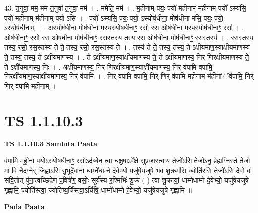 \documentclass[17pt]{extarticle}
\begin{document}
43. त॒नुवा॒ मम॒ मम॑ त॒नुवा॑ त॒नुवा॒ मम॑ । . ममेति॒ मम॑ । . म॒ही॒नाम् पयः॒ पयो॑ मही॒नाम् म॑ही॒नाम् पयो᳚ ऽस्यसि॒ पयो॑ मही॒नाम् म॑ही॒नाम् पयो॑ ऽसि । . पयो᳚ ऽस्यसि॒ पयः॒ पयो॒ ऽस्योष॑धीना॒ मोष॑धीना मसि॒ पयः॒ पयो॒ ऽस्योष॑धीनाम् । . अ॒स्योष॑धीना॒ मोष॑धीना मस्य॒स्योष॑धीनाꣳ॒॒ रसो॒ रस॒ ओष॑धीना मस्य॒स्योष॑धीनाꣳ॒॒ रसः॑ । . ओष॑धीनाꣳ॒॒ रसो॒ रस॒ ओष॑धीना॒ मोष॑धीनाꣳ॒॒ रस॒स्तस्य॒ तस्य॒ रस॒ ओष॑धीना॒ मोष॑धीनाꣳ॒॒ रस॒स्तस्य॑ । . रस॒स्तस्य॒ तस्य॒ रसो॒ रस॒स्तस्य॑ ते ते॒ तस्य॒ रसो॒ रस॒स्तस्य॑ ते । . तस्य॑ ते ते॒ तस्य॒ तस्य॒ ते ऽक्षी॑यमाण॒स्याक्षी॑यमाणस्य ते॒ तस्य॒ तस्य॒ ते ऽक्षी॑यमाणस्य । . ते ऽक्षी॑यमाण॒स्याक्षी॑यमाणस्य ते॒ ते ऽक्षी॑यमाणस्य॒ निर् णिरक्षी॑यमाणस्य ते॒ ते ऽक्षी॑यमाणस्य॒ निः । . अक्षी॑यमाणस्य॒ निर् णिरक्षी॑यमाण॒स्याक्षी॑यमाणस्य॒ निर् व॑पामि वपामि॒ निरक्षी॑यमाण॒स्याक्षी॑यमाणस्य॒ निर् व॑पामि । . निर् व॑पामि वपामि॒ निर् णिर् व॑पामि मही॒नाम् म॑ही॒नां ॅव॑पामि॒ निर् णिर् व॑पामि मही॒नाम् । \newline
\pagebreak
{}
\section*{ TS 1.1.10.3 }

\textbf{TS 1.1.10.3 } \newline
\textbf{Samhita Paata} \newline

व॑पामि मही॒नां पयो॒ऽस्योष॑धीनाꣳ॒॒ रसोऽद॑ब्धेन त्वा॒ चक्षु॒षाऽवे᳚क्षे सुप्रजा॒स्त्वाय॒ तेजो॑ऽसि॒ तेजोऽनु॒ प्रेह्य॒ग्निस्ते॒ तेजो॒ मा वि नै॑द॒ग्नेर् जि॒ह्वाऽसि॑ सु॒भूर्दे॒वानां॒ धाम्ने॑धाम्ने दे॒वेभ्यो॒ यजु॑षेयजुषे भव शु॒क्रम॑सि॒ ज्योति॑रसि॒ तेजो॑ऽसि दे॒वो वः॑ सवि॒तोत् पु॑ना॒त्वच्छि॑द्रेण प॒वित्रे॑ण॒ वसोः॒ सूर्य॑स्य र॒श्मिभिः॑ शु॒क्रं ( ) त्वा॑ शु॒क्रायां॒ धाम्ने॑धाम्ने दे॒वेभ्यो॒ यजु॑षेयजुषे गृह्णामि॒ ज्योति॑स्त्वा॒ ज्योति॑ष्य॒र्चिस्त्वा॒ऽर्चिषि॒ धाम्ने॑धाम्ने दे॒वेभ्यो॒ यजु॑षेयजुषे गृह्णामि ॥ \newline

\textbf{Pada Paata} \newline
\end{document}
